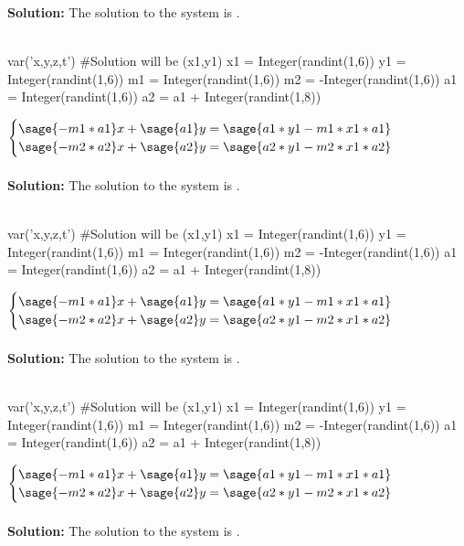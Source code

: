 \documentclass{ximera}
\begin{document}
\begin{shuffle}
\begin{question}
{\bf Solution:} The solution to the system is 
.\\\\
\end{question}
\begin{question}
\begin{sagesilent}
var('x,y,z,t')
#Solution will be (x1,y1)
x1 = Integer(randint(1,6))
y1 = Integer(randint(1,6))
m1 = Integer(randint(1,6))
m2 = -Integer(randint(1,6)) 
a1 = Integer(randint(1,6))
a2 = a1 + Integer(randint(1,8))
\end{sagesilent}
$\begin{cases}
\sage{-m1*a1}x+\sage{a1}y=\sage{a1*y1-m1*x1*a1}\\
\sage{-m2*a2}x+\sage{a2}y=\sage{a2*y1-m2*x1*a2}\\
\end{cases}$\\\\

{\bf Solution:} The solution to the system is 
.\\\\
\end{question}
\begin{question}
\begin{sagesilent}
var('x,y,z,t')
#Solution will be (x1,y1)
x1 = Integer(randint(1,6))
y1 = Integer(randint(1,6))
m1 = Integer(randint(1,6))
m2 = -Integer(randint(1,6)) 
a1 = Integer(randint(1,6))
a2 = a1 + Integer(randint(1,8))
\end{sagesilent}
$\begin{cases}
\sage{-m1*a1}x+\sage{a1}y=\sage{a1*y1-m1*x1*a1}\\
\sage{-m2*a2}x+\sage{a2}y=\sage{a2*y1-m2*x1*a2}\\
\end{cases}$\\\\

{\bf Solution:} The solution to the system is 
.\\\\
\end{question}
\begin{question}
\begin{sagesilent}
var('x,y,z,t')
#Solution will be (x1,y1)
x1 = Integer(randint(1,6))
y1 = Integer(randint(1,6))
m1 = Integer(randint(1,6))
m2 = -Integer(randint(1,6)) 
a1 = Integer(randint(1,6))
a2 = a1 + Integer(randint(1,8))
\end{sagesilent}
$\begin{cases}
\sage{-m1*a1}x+\sage{a1}y=\sage{a1*y1-m1*x1*a1}\\
\sage{-m2*a2}x+\sage{a2}y=\sage{a2*y1-m2*x1*a2}\\
\end{cases}$\\\\

{\bf Solution:} The solution to the system is 
.\\\\
\end{question}

\end{shuffle}
\end{document}
